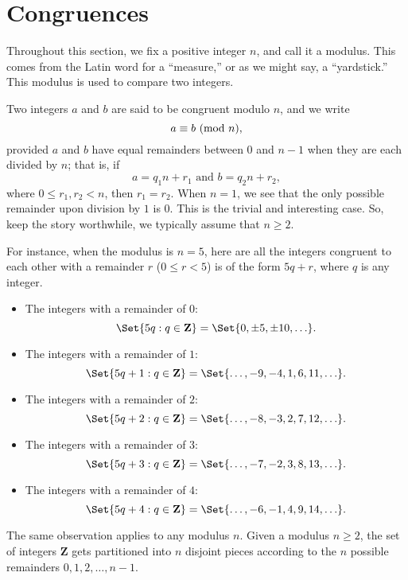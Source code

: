 \section{Congruences}
Throughout this section, we fix a positive integer $n$, and call it a modulus. This
comes from the Latin word for a ``measure,'' or as we might say, a ``yardstick.'' This
modulus is used to compare two integers.
\begin{Definition}{}{}
    Two integers $ a $ and $ b $ are said to be congruent modulo $ n $, and we write
    \[ a\equiv b\ (\mathrm{mod}\ n), \]
    provided $ a $ and $ b $ have equal remainders between $ 0 $ and $ n-1 $ when they are
    each divided by $ n $; that is, if
    \[ a=q_1n+r_1\text{ and }b=q_2n+r_2, \]
    where $ 0\le r_1,r_2<n $, then $ r_1=r_2 $.
    \tcblower{}
    When $n = 1$, we see that the only possible remainder upon division by $1$ is $0$.
    This is the trivial and interesting case. So, keep the story worthwhile, we typically
    assume that $ n\ge 2 $.
\end{Definition}
\begin{Example}{}{}
    For instance, when the modulus is $ n=5 $, here are all the integers congruent to each other with a remainder
    $ r $ ($ 0\le r<5 $) is of the form $ 5q+r $, where $ q $ is any integer.
    \begin{itemize}
        \item The integers with a remainder of $ 0 $:
              \[ \Set{5q\given q\in\mathbf{Z}}=\Set{0,\pm 5,\pm 10,\ldots}. \]
        \item The integers with a remainder of $ 1 $:
              \[ \Set{5q+1\given q\in\mathbf{Z}}=\Set{\ldots,-9,-4,1,6,11,\ldots}. \]
        \item The integers with a remainder of $ 2 $:
              \[ \Set{5q+2\given q\in\mathbf{Z}}=\Set{\ldots,-8,-3,2,7,12,\ldots}. \]
        \item The integers with a remainder of $ 3 $:
              \[ \Set{5q+3\given q\in\mathbf{Z}}=\Set{\ldots,-7,-2,3,8,13,\ldots}. \]
        \item The integers with a remainder of $ 4 $:
              \[ \Set{5q+4\given q\in\mathbf{Z}}=\Set{\ldots,-6,-1,4,9,14,\ldots}. \]
    \end{itemize}
    The same observation applies to any modulus $n$. Given a modulus $ n\ge 2 $, the
    set of integers $ \mathbf{Z} $ gets partitioned into $n$ disjoint pieces according to the $n$ possible
    remainders $ 0,1,2,\ldots,n-1 $.
\end{Example}

